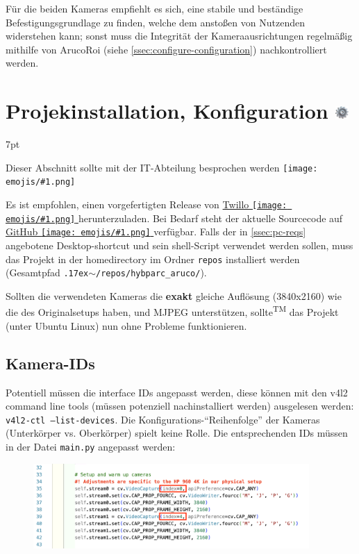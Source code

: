 \documentclass[a4paper, 10pt]{article}
\newcommand{\code}[1]{\texttt{#1}}
\newcommand{\emoji}[1]{
    \begingroup\normalfont
    \texttt{[image: emojis/\#1.png]}
    \endgroup
}
\newcommand{\realtilde}{{\raise.17ex\hbox{$\scriptstyle \mathtt{\sim}$}}}
\newenvironment{tooltip}{%
\small
\vspace*{-4mm}
    \def\FrameCommand{%
    \hspace{1pt}%
    {\color{tooltippipe}\vrule width 0.7mm}%
    {\color{tooltipshade}\vrule width 1.5mm}%
    \colorbox{tooltipshade}%
    }%
    \MakeFramed{\advance\hsize-\width\FrameRestore}%
    \noindent%
    \begin{adjustwidth}{}{7pt}%
    \vspace{2pt}\vspace{2pt}%
}
{%
    \vspace{2pt}\end{adjustwidth}\endMakeFramed%
}
\begin{document}
\noindent Für die beiden Kameras empfiehlt es sich, eine stabile und beständige Befestigungsgrundlage zu finden, welche dem anstoßen von Nutzenden widerstehen kann; sonst muss die Integrität der Kameraausrichtungen regelmäßig mithilfe von ArucoRoi (siehe \ref{ssec:configure-configuration}) nachkontrolliert werden.

\section{Projekinstallation, Konfiguration \includegraphics[height=0.65em]{emojis/gear.png}}
\label{sec:installation-configuration}
\begin{tooltip}
    Dieser Abschnitt sollte mit der IT-Abteilung besprochen werden\emoji{technologist}
\end{tooltip}
Es ist empfohlen, einen vorgefertigten Release von \href{https://www.twillo.de/edu-sharing/components/render/1345111e-baf1-4023-b27e-66bcd533de3a}{Twillo\emoji{link}} herunterzuladen. Bei Bedarf steht der aktuelle Sourcecode auf \href{https://github.com/leloomi/hybparc_aruco}{GitHub\emoji{link}} verfügbar. Falls der in \ref{ssec:pc-reqs} angebotene Desktop-shortcut und sein shell-Script verwendet werden sollen, muss das Projekt in der homedirectory im Ordner \code{repos} installiert werden (Gesamtpfad \code{\realtilde/repos/hybparc\_aruco/}).

Sollten die verwendeten Kameras die \textbf{exakt} gleiche Auflösung (3840x2160) wie die des Originalsetups haben, und MJPEG unterstützen, sollte\textsuperscript{\tiny TM} das Projekt (unter Ubuntu Linux) nun ohne Probleme funktionieren. 

\subsection{Kamera-IDs}
\label{ssec:cam-indices}
Potentiell müssen die interface IDs angepasst werden, diese können mit den v4l2 command line tools (müssen potenziell nachinstalliert werden) ausgelesen werden: \code{v4l2-ctl --list-devices}. Die Konfigurations-\enquote{Reihenfolge} der Kameras (Unterkörper vs. Oberkörper) spielt keine Rolle. Die entsprechenden IDs müssen in der Datei \code{main.py} angepasst werden:
\begin{figure}[H]
    \centering
    \includegraphics[width=10.5cm]{camera-indices.png}
\end{figure}
\end{document}
